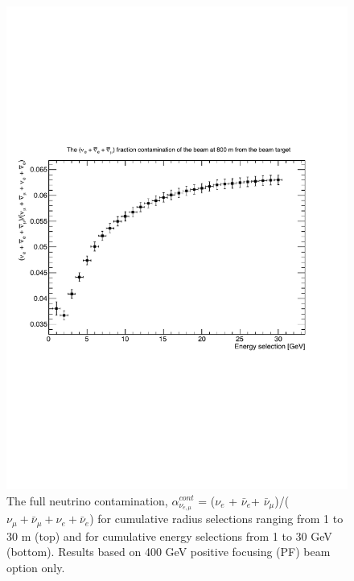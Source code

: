 \begin{figure}[htbp]
\begin{center}
 	\includegraphics[width=120mm]{Chapter3/figures/400GeV_PF_nueAndNueBarAndNuMuBarRatio_EnergyCuts.pdf}
      \caption{The full neutrino contamination, $\alpha_{\nu_{e,\mu}}^{cont}$ = ($\nu_{e}$ + $\bar{\nu}_{e}$+ $\bar{\nu}_{\mu}$)/($\nu_{\mu} + \bar{\nu}_{\mu} + \nu_{e} + \bar{\nu}_{e}$) for cumulative radius selections ranging from 1 to 30 m (top) and for cumulative energy selections from 1 to 30 GeV (bottom). Results based on 400 GeV positive focusing (PF) beam option only.}
    \label{fig:nueAndNuMuBarContamination}
\end{center}
\end{figure}


